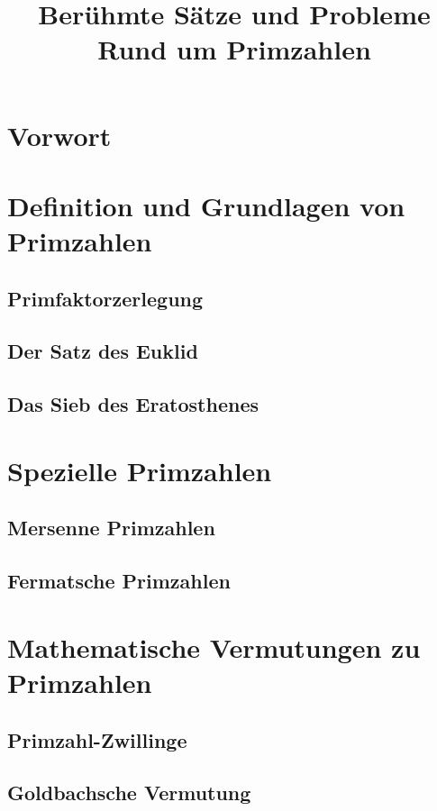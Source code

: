 \documentclass[11pt]{article}
\begin{document}
\title{Berühmte Sätze und Probleme Rund um Primzahlen}
\tableofcontents
\newpage
\section*{Vorwort}

\newpage
\section{Definition und Grundlagen von Primzahlen}
%
\subsection{Primfaktorzerlegung}

\subsection{Der Satz des Euklid}
\subsection{Das Sieb des Eratosthenes}
\section{Spezielle Primzahlen}
\subsection{Mersenne Primzahlen}
\subsection{Fermatsche Primzahlen}
\section{Mathematische Vermutungen zu Primzahlen}
\subsection{Primzahl-Zwillinge}
\subsection{Goldbachsche Vermutung}
\end{document}
